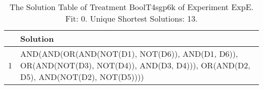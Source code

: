 \begin{table}[ht]
\centering
\begin{tabular}{rp{9cm}}
  \hline
 & Solution \\ 
  \hline
1 & AND(AND(OR(AND(NOT(D1), NOT(D6)), AND(D1, D6)), OR(AND(NOT(D3), NOT(D4)), AND(D3, D4))), OR(AND(D2, D5), AND(NOT(D2), NOT(D5)))) \\ 
   \hline
\end{tabular}
\caption{The Solution Table of Treatment BoolT4sgp6k of Experiment ExpE. Fit: 0. Unique Shortest Solutions: 13.} 
\end{table}
